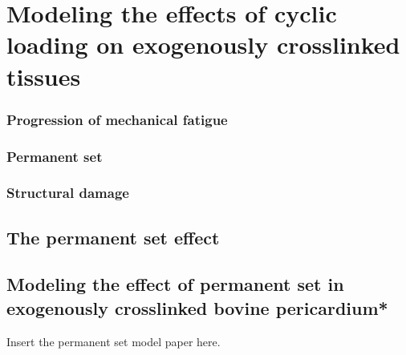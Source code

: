 \chapter{Modeling the effects of cyclic loading on exogenously crosslinked tissues}

\subsection{Progression of mechanical fatigue}
\subsection{Permanent set}
\subsection{Structural damage}

\section{The permanent set effect}

\section{Modeling the effect of permanent set in exogenously crosslinked bovine pericardium*}

Insert the permanent set model paper here.
